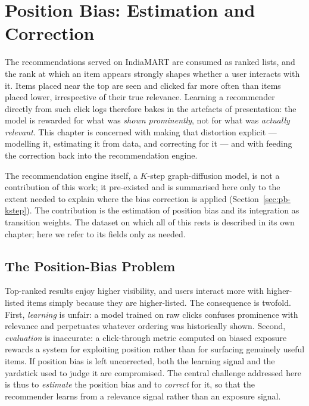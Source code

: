 \chapter{Position Bias: Estimation and Correction}
\label{ch:position-bias}

The recommendations served on IndiaMART are consumed as ranked lists, and the
rank at which an item appears strongly shapes whether a user interacts with it.
Items placed near the top are seen and clicked far more often than items placed
lower, irrespective of their true relevance. Learning a recommender directly
from such click logs therefore bakes in the artefacts of presentation: the
model is rewarded for what was \emph{shown prominently}, not for what was
\emph{actually relevant}. This chapter is concerned with making that distortion
explicit --- modelling it, estimating it from data, and correcting for it ---
and with feeding the correction back into the recommendation engine.

The recommendation engine itself, a $K$-step graph-diffusion model, is not a
contribution of this work; it pre-existed and is summarised here only to the
extent needed to explain where the bias correction is applied
(Section~\ref{sec:pb-kstep}). The contribution is the estimation of position
bias and its integration as transition weights. The dataset on which all of
this rests is described in its own chapter; here we refer to its fields only as
needed.

\section{The Position-Bias Problem}
\label{sec:pb-problem}

Top-ranked results enjoy higher visibility, and users interact more with
higher-listed items simply because they are higher-listed. The consequence is
twofold. First, \emph{learning} is unfair: a model trained on raw clicks
confuses prominence with relevance and perpetuates whatever ordering was
historically shown. Second, \emph{evaluation} is inaccurate: a click-through
metric computed on biased exposure rewards a system for exploiting position
rather than for surfacing genuinely useful items. If position bias is left
uncorrected, both the learning signal and the yardstick used to judge it are
compromised. The central challenge addressed here is thus to \emph{estimate}
the position bias and to \emph{correct} for it, so that the recommender learns
from a relevance signal rather than an exposure signal.

